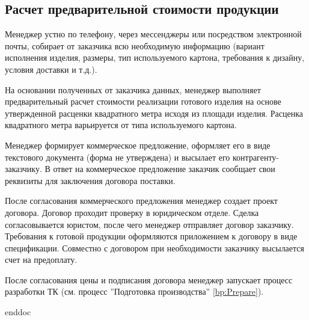 \newpage
\subsection{Расчет предварительной стоимости продукции}
\label{bp:calculation}


Менеджер устно по телефону, через мессенджеры или посредством электронной почты, собирает от заказчика всю необходимую информацию (вариант исполнения изделия, размеры, тип используемого картона, требования к дизайну, условия доставки и т.д.). 

На основании полученных от заказчика данных, менеджер выполняет предварительный расчет стоимости реализации готового изделия на основе  утвержденной расценки квадратного метра исходя из площади изделия. 
Расценка квадратного метра варьируется от типа используемого картона.

Менеджер формирует коммерческое предложение, оформляет его в виде текстового документа (форма не утверждена) и высылает его контрагенту-заказчику. В ответ на коммерческое предложение заказчик сообщает свои реквизиты для заключения договора поставки.

После согласования коммерческого предложения менеджер создает проект договора. Договор проходит проверку в юридическом отделе. Сделка согласовывается юристом, после чего менеджер отправляет договор заказчику. Требования к готовой продукции оформляются приложением к договору в виде спецификации. Совместно с договором при необходимости заказчику высылается счет на предоплату.


После согласования цены и подписания договора менеджер запускает процесс разработки ТК (см. процесс ''Подготовка производства'' \ref{bp:Prepare}).



\clearpage
 {enddoc}